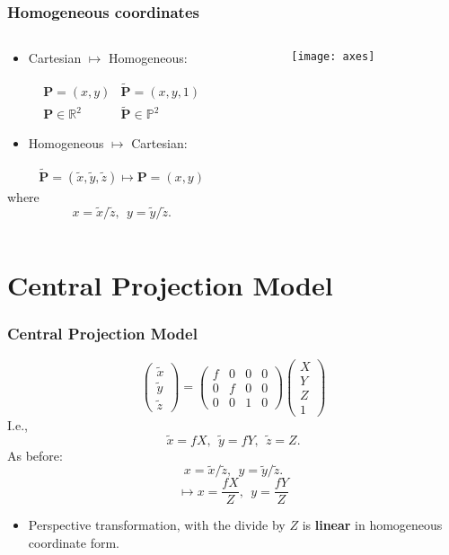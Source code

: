 \begin{frame}
\frametitle{Homogeneous coordinates}
\begin{columns}
\begin{column}{.5\textwidth}
\begin{itemize}
\item Cartesian $\mapsto$ Homogeneous:
\end{itemize}
\[
\begin{array}{cc}
\textbf{P} = \left ( x, y \right ) & \tilde{\textbf{P}} = \left ( x, y, 1 \right ) \\
\textbf{P} \in \mathbb{R}^2 & \tilde{\textbf{P}} \in \mathbb{P}^2
\end{array}
\]
\begin{itemize}
\item Homogeneous $\mapsto$ Cartesian:
\end{itemize}
\[
\begin{array}{cc}
\tilde{\textbf{P}} = \left ( \tilde{x}, \tilde{y}, \tilde{z} \right ) \mapsto \textbf{P} = \left ( x, y \right )
\end{array}
\]
where
\[
x = \tilde{x}/\tilde{z},\ \ y = \tilde{y}/\tilde{z}.
\]
\end{column}
\begin{column}{.5\textwidth}
\begin{figure}[!h]
\centering
\texttt{[image: axes]}
\end{figure}
\end{column}
\end{columns}
\end{frame}

\section{Central Projection Model}

\begin{frame}
\frametitle{Central Projection Model}
\[
\left (
\begin{array}{c}
\tilde{x}\\
\tilde{y}\\
\tilde{z}
\end{array}
\right )
=
\left (
\begin{array}{cccc}
f & 0 & 0 & 0 \\
0 & f & 0 & 0 \\
0 & 0 & 1 & 0
\end{array}
\right )
\left (
\begin{array}{c}
X \\
Y \\
Z \\
1
\end{array}
\right )
\]
I.e.,
\[
\tilde{x} = fX,\ \ \tilde{y} = fY,\ \ \tilde{z} = Z.
\]
As before:
\[
x = \tilde{x}/\tilde{z},\ \ y = \tilde{y}/\tilde{z}.
\]
\[
\mapsto x = \dfrac{fX}{Z},\ \ y = \dfrac{fY}{Z}
\]
\begin{itemize}
\item Perspective transformation, with the divide by $Z$ is \textbf{linear} in homogeneous coordinate form.
\end{itemize}
\end{frame}

